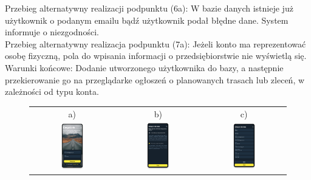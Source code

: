 Przebieg alternatywny realizacji podpunktu (6a): W bazie danych istnieje już użytkownik o podanym emailu bądź użytkownik podał błędne dane. System informuje o niezgodności. \\
Przebieg alternatywny realizacja podpunktu (7a): Jeżeli konto ma reprezentować osobę fizyczną, pola do wpisania informacji o przedsiębiorstwie nie wyświetlą się. \\
Warunki końcowe: Dodanie utworzonego użytkownika do bazy, a następnie przekierowanie go na przeglądarke ogłoszeń o planowanych trasach lub zleceń, w zależności od typu konta.
\begin{figure}[H]
 \centering
  \begin{tabular}{@{}ccc@{}}
  a) & b) & c)\\
  \includegraphics[width=0.3\textwidth]{rozdzial1/logowanie_m.png} &
  \includegraphics[width=0.3\textwidth]{rozdzial1/wybor_1_m.png} &
  \includegraphics[width=0.3\textwidth]{rozdzial1/rejestracja_m.png}

\end{tabular}
\end{figure}
